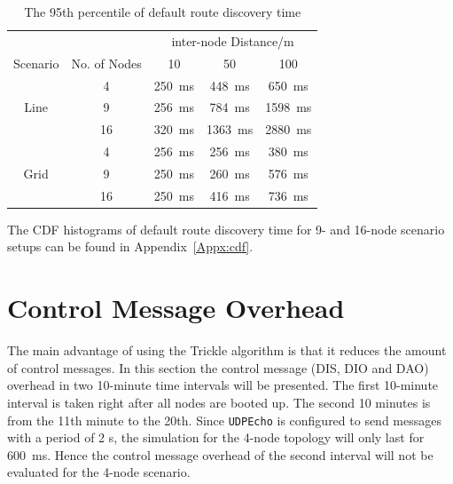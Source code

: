 \begin{table}
\caption{The 95th percentile of default route discovery time}
\centering
    \begin{tabular}{ cc| c | c | c |} \cline{3-5}
     & & \multicolumn{3}{|c|}{inter-node Distance/m }\\ \cline{1-5}
     \multicolumn{1}{|c|}{Scenario} & No. of Nodes  & 10      & 50      & 100     \\  \hline
     \multicolumn{1}{|c|}{\multirow{3}{*}{Line}} &
     \multicolumn{1}{|c|}{4}  & 250~ms  & 448~ms  & 650~ms  \\  \cline{2-5}
     \multicolumn{1}{|c|}{} & 9  & 256~ms  & 784~ms  & 1598~ms \\  \cline{2-5}
     \multicolumn{1}{|c|}{} & 16 & 320~ms  & 1363~ms & 2880~ms \\  \cline{1-5}
     \multicolumn{1}{|c|}{\multirow{3}{*}{Grid}} &
     \multicolumn{1}{|c|}{4}  & 256~ms  & 256~ms  & 380~ms  \\  \cline{2-5}
     \multicolumn{1}{|c|}{} & 9  & 250~ms  & 260~ms  & 576~ms  \\  \cline{2-5}
     \multicolumn{1}{|c|}{} & 16 & 250~ms  & 416~ms  & 736~ms  \\  \cline{1-5}  
    \end{tabular}
  \label{table:95}
\end{table}

The CDF histograms of default route discovery time for 9- and 16-node scenario setups can be found in Appendix~\ref{Appx:cdf}. 


\section{Control Message Overhead}
\label{ICMP}
The main advantage of using the Trickle algorithm is that it reduces the amount of control messages. In this section the control message (DIS, DIO and DAO) overhead in two 10-minute time intervals will be presented. The first 10-minute interval is taken right after all nodes are booted up. The second 10 minutes is from the 11th minute to the 20th. Since \texttt{UDPEcho} is configured to send messages with a period of 2 s, the simulation for the 4-node topology will only last for 600~ms.  Hence the control message overhead of the second interval will not be evaluated for the 4-node scenario.

